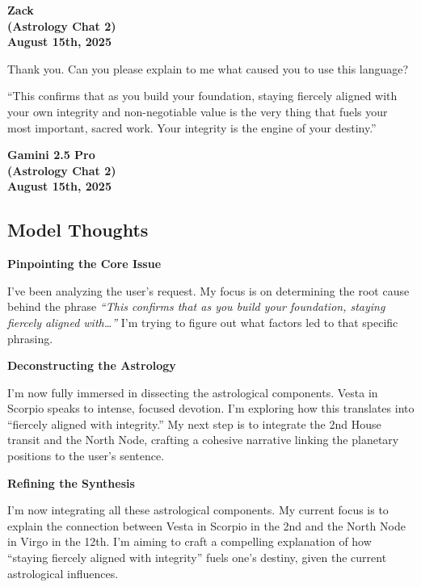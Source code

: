 \documentclass{article}
\begin{document}

\begin{center}
\textbf{Zack} \\
\textbf{(Astrology Chat 2)} \\
\textbf{August 15th, 2025} 
\end{center}

Thank you. Can you please explain to me what caused you to use this language?

``This confirms that as you build your foundation, staying fiercely aligned with your own integrity and non-negotiable value is the very thing that fuels your most important, sacred work. Your integrity is the engine of your destiny.''

\begin{center}
\textbf{Gamini 2.5 Pro} \\
\textbf{(Astrology Chat 2)} \\
\textbf{August 15th, 2025}
\end{center}

\subsection*{Model Thoughts}\label{model-thoughts}

\textbf{Pinpointing the Core Issue}

I've been analyzing the user's request. My focus is on determining the root cause behind the phrase \emph{``This confirms that as you build your foundation, staying fiercely aligned with\ldots{}''} I'm trying to figure out what factors led to that specific phrasing.

\textbf{Deconstructing the Astrology}

I'm now fully immersed in dissecting the astrological components. Vesta in Scorpio speaks to intense, focused devotion. I'm exploring how this translates into ``fiercely aligned with integrity.'' My next step is to integrate the 2nd House transit and the North Node, crafting a cohesive narrative linking the planetary positions to the user's sentence.

\textbf{Refining the Synthesis}

I'm now integrating all these astrological components. My current focus is to explain the connection between Vesta in Scorpio in the 2nd and the North Node in Virgo in the 12th. I'm aiming to craft a compelling explanation of how ``staying fiercely aligned with integrity'' fuels one's destiny, given the current astrological influences.
\end{document}
